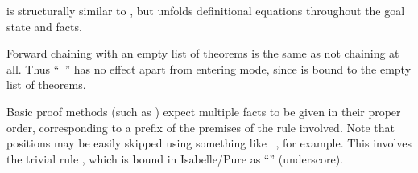 \begin{isabellebody}
\begin{isamarkuptext}
\begin{descr}
  \item [\mbox{\isa{\isacommand{unfolding}}}~\isa{{\isachardoublequote}b\isactrlsub {\isadigit{1}}\ {\isasymdots}\ b\isactrlsub n{\isachardoublequote}}] is
  structurally similar to \mbox{}, but unfolds definitional
  equations  throughout the goal state
  and facts.

  \end{descr}

  Forward chaining with an empty list of theorems is the same as not
  chaining at all.  Thus ``\mbox{}~'' has no
  effect apart from entering  mode, since
  \mbox{} is bound to the empty list of theorems.

  Basic proof methods (such as \mbox{}) expect multiple
  facts to be given in their proper order, corresponding to a prefix
  of the premises of the rule involved.  Note that positions may be
  easily skipped using something like \mbox{}~, for example.  This involves the trivial rule
  , which is bound in Isabelle/Pure as
  ``\mbox{\isa{{\isacharunderscore}}}'' (underscore).


\end{isamarkuptext}
\end{isabellebody}
